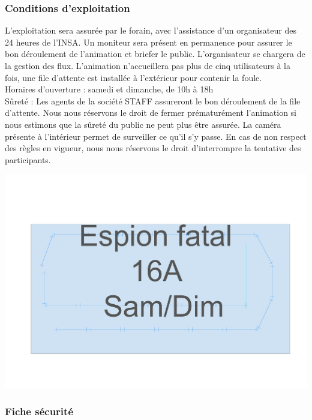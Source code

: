 \documentclass[hidelinks, paper=a4, fontsize=13pt]{report}
\begin{document}
\subsubsection{Conditions d’exploitation}
L’exploitation sera assurée par le forain, avec l’assistance d’un organisateur des 24 heures de l’INSA. Un moniteur sera présent en permanence pour assurer le bon déroulement de l’animation et briefer le public. L’organisateur se chargera de la gestion des flux. L’animation n'accueillera pas plus de cinq utilisateurs à la fois, une file d’attente est installée à l’extérieur pour contenir la foule. \\

Horaires d’ouverture : samedi et dimanche, de 10h à 18h \\

Sûreté : Les agents de la société STAFF assureront le bon déroulement de la file d’attente. Nous nous réservons le droit de fermer prématurément l’animation si nous estimons que la sûreté du public ne peut plus être assurée. La caméra présente à l’intérieur permet de surveiller ce qu’il s’y passe. En cas de non respect des règles en vigueur, nous nous réservons le droit d’interrompre la tentative des participants. \\

\begin{center}
\includegraphics[width=\textwidth,keepaspectratio]{Exports/Plan_24h_44eme-Espion_Fatal}
\end{center}

\subsubsection{Fiche sécurité}
\end{document}
